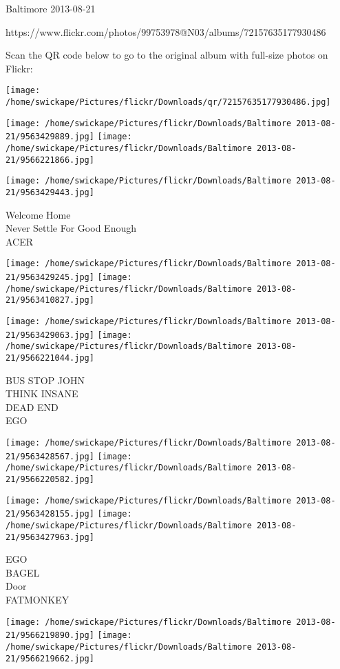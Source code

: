 \documentclass[10pt,letterpaper]{article}
\begin{document}
Baltimore 2013-08-21

https://www.flickr.com/photos/99753978@N03/albums/72157635177930486

Scan the QR code below to go to the original album with full-size photos on Flickr:

\texttt{[image: /home/swickape/Pictures/flickr/Downloads/qr/72157635177930486.jpg]}
\pagebreak

\texttt{[image: /home/swickape/Pictures/flickr/Downloads/Baltimore 2013-08-21/9563429889.jpg]}
\texttt{[image: /home/swickape/Pictures/flickr/Downloads/Baltimore 2013-08-21/9566221866.jpg]}

\vspace{0.25in}
\texttt{[image: /home/swickape/Pictures/flickr/Downloads/Baltimore 2013-08-21/9563429443.jpg]}

Welcome Home\\
Never Settle For Good Enough\\
ACER
\pagebreak

\texttt{[image: /home/swickape/Pictures/flickr/Downloads/Baltimore 2013-08-21/9563429245.jpg]}
\texttt{[image: /home/swickape/Pictures/flickr/Downloads/Baltimore 2013-08-21/9563410827.jpg]}

\texttt{[image: /home/swickape/Pictures/flickr/Downloads/Baltimore 2013-08-21/9563429063.jpg]}
\texttt{[image: /home/swickape/Pictures/flickr/Downloads/Baltimore 2013-08-21/9566221044.jpg]}

BUS STOP JOHN\\
THINK INSANE\\
DEAD END\\
EGO
\pagebreak

\texttt{[image: /home/swickape/Pictures/flickr/Downloads/Baltimore 2013-08-21/9563428567.jpg]}
\texttt{[image: /home/swickape/Pictures/flickr/Downloads/Baltimore 2013-08-21/9566220582.jpg]}

\texttt{[image: /home/swickape/Pictures/flickr/Downloads/Baltimore 2013-08-21/9563428155.jpg]}
\texttt{[image: /home/swickape/Pictures/flickr/Downloads/Baltimore 2013-08-21/9563427963.jpg]}

EGO\\
BAGEL\\
Door\\
FATMONKEY
\pagebreak

\texttt{[image: /home/swickape/Pictures/flickr/Downloads/Baltimore 2013-08-21/9566219890.jpg]}
\texttt{[image: /home/swickape/Pictures/flickr/Downloads/Baltimore 2013-08-21/9566219662.jpg]}
\end{document}
